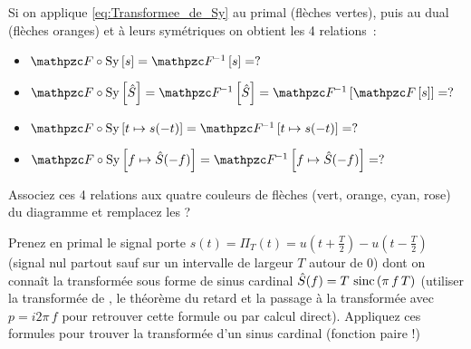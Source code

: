 \begin{exercice}
  Si on applique \eqref{eq:Transformee_de_Sy} au primal (flèches
  vertes), puis au dual (flèches oranges) et à leurs symétriques on
  obtient les 4 relations~:
  \begin{itemize}
  \item $\F\circ\Sy\b{s} = \Finv\b{s} = ?$
  \item
    $\F\circ\Sy\b{\hat{S}} = \Finv\b{\hat{S}} = \Finv\b{\F\b{s}}= ?$
  \item $\F\circ\Sy\b{t\mapsto s(-t)} = \Finv\b{t\mapsto s(-t)} = ?$
  \item
    $\F\circ\Sy\b{f\mapsto \hat{S}(-f)} = \Finv\b{f\mapsto
      \hat{S}(-f)} = ?$
  \end{itemize}

  Associez ces 4 relations aux quatre couleurs de flèches (vert,
  orange, cyan, rose) du diagramme et remplacez les \og{}?\fg{}

  Prenez en primal le signal porte
  $s(t)=\Pi_T(t)=u(t+\frac{T}{2})-u(t-\frac{T}{2})$ (signal nul
  partout sauf sur un intervalle de largeur $T$ autour de 0) dont on
  connaît la transformée sous forme de sinus cardinal
  $\hat{S}(f)=T\,\mathop{\mathrm{sinc}}\left(\pi\,f\,T\right)$ (utiliser la transformée de
  \Laplace, le théorème du retard et la passage à la transformée avec
  $p=i2\pi\,f$ pour retrouver cette formule ou par calcul
  direct). Appliquez ces formules pour trouver la transformée d'un
  sinus cardinal (fonction paire !)
\end{exercice}


